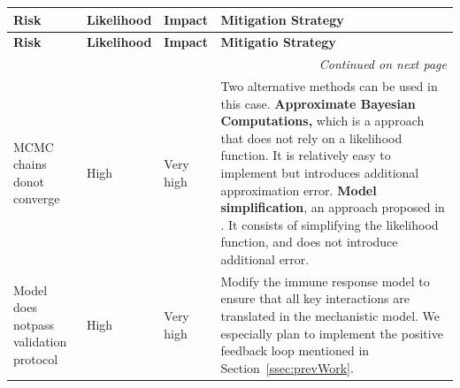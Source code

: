 \documentclass[11pt]{article}
\begin{document}
\begin{table}[!ht]
    \caption{Table of the different risks associated with the project's objectives}

    \label{tbl:hyperparams}
\begin{longtable}{|p{3.5cm}|p{2.3cm}|p{2.3cm}|p{8cm}|}
    \hline
    \textbf{Risk} & \textbf{Likelihood} & \textbf{Impact} & \textbf{Mitigation Strategy}\\
    \hline
    \endfirsthead
    \hline
    \textbf{Risk} & \textbf{Likelihood} & \textbf{Impact} & \textbf{Mitigatio Strategy}\\
    \hline
    \endhead
    \hline
    \multicolumn{4}{|r|}{\textit{Continued on next page}} \\
    \hline
    \endfoot
    \hline
\endlastfoot
        \hline
        MCMC chains do\newline not converge  & High & Very high & 
        Two alternative methods can be used in this case.
        \textbf{Approximate Bayesian Computations,} which is a approach that does not rely on a likelihood function. It is relatively easy to implement but introduces additional approximation error. \textbf{Model simplification}, an approach proposed in \cite{gelman2020bayesian}. It consists of simplifying the likelihood function, and does not introduce additional error.
        \\ \hline 
        Model does not\newline pass validation protocol& High & Very high & Modify the immune response model to ensure that all key interactions are translated in the mechanistic model. We especially plan to implement the positive feedback loop mentioned in Section~\ref{ssec:prevWork}. \\ \hline 
\end{longtable}
\end{table}
\end{document}
